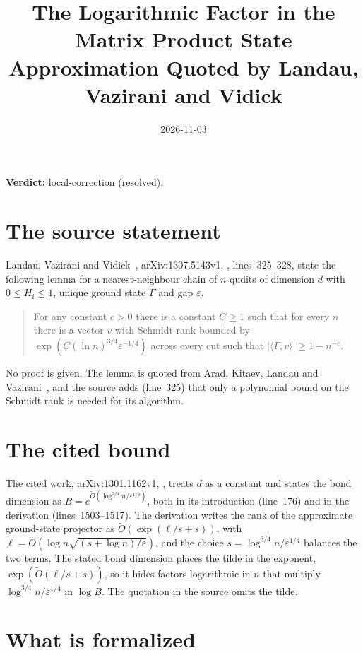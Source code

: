 \documentclass{article}
\title{The Logarithmic Factor in the Matrix Product State Approximation Quoted by Landau, Vazirani and Vidick}
\author{}
\date{2026-11-03}
\providecommand{\gapnote}[2]{\par\noindent\textbf{Verdict:} #1 (#2).\par}
\begin{document}
\maketitle
\gapnote{local-correction}{resolved}

\section{The source statement}

Landau, Vazirani and Vidick~\cite{Landau2015Polynomial},
arXiv:1307.5143v1, , lines~325--328, state the following
lemma for a nearest-neighbour chain of $n$ qudits of dimension $d$ with
$0\le H_i\le1$, unique ground state $\Gamma$ and gap $\varepsilon$.
\begin{quote}
    For any constant $c>0$ there is a constant $C\ge1$ such that for every
    $n$ there is a vector $v$ with Schmidt rank bounded by
    $\exp(C(\ln n)^{3/4}\varepsilon^{-1/4})$ across every cut such that
    $\lvert\langle\Gamma,v\rangle\rvert\ge1-n^{-c}$.
\end{quote}
No proof is given. The lemma is quoted from Arad, Kitaev, Landau and
Vazirani~\cite{Arad2013AreaLaw}, and the source adds (line~325) that only a
polynomial bound on the Schmidt rank is needed for its algorithm.

\section{The cited bound}

The cited work, arXiv:1301.1162v1, , treats $d$ as a
constant and states the bond dimension as
$B=e^{\tilde O(\log^{3/4}n/\varepsilon^{1/4})}$, both in its introduction
(line~176) and in the derivation (lines~1503--1517). The derivation writes
the rank of the approximate ground-state projector as
$\tilde O(\exp(\ell/s+s))$, with
$\ell=O(\log n\sqrt{(s+\log n)/\varepsilon})$, and the choice
$s=\log^{3/4}n/\varepsilon^{1/4}$ balances the two terms. The stated bond
dimension places the tilde in the exponent, $\exp(\tilde O(\ell/s+s))$, so
it hides factors logarithmic in $n$ that multiply
$\log^{3/4}n/\varepsilon^{1/4}$ in $\log B$. The quotation in the source
omits the tilde.

\section{What is formalized}
\end{document}

